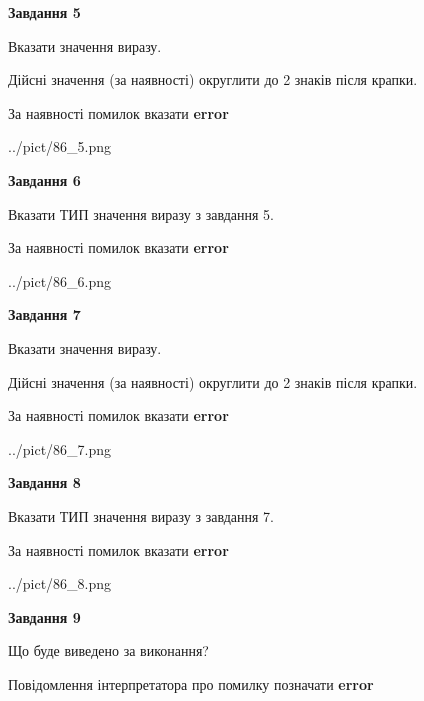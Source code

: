 \documentclass[11pt, ukrainian]{article}
\begin{document}
{\begin {large}
{\begin {center}\textbf{Завдання 5}\end {center}}\par
Вказати значення виразу. \par
Дійсні значення (за наявності) округлити до 2 знаків після крапки. \par
За наявності помилок вказати \textbf{error}

\begin{center}
	{../pict/86_5.png}
\end{center}
\newpage

{\begin {center}\textbf{Завдання 6}\end {center}}\par
Вказати ТИП значення виразу з завдання 5. \par
За наявності помилок вказати \textbf{error}

\begin{center}
	{../pict/86_6.png}
\end{center}
\newpage

{\begin {center}\textbf{Завдання 7}\end {center}}\par
Вказати значення виразу. \par
Дійсні значення (за наявності) округлити до 2 знаків після крапки. \par
За наявності помилок вказати \textbf{error}

\begin{center}
	{../pict/86_7.png}
\end{center}
\newpage

{\begin {center}\textbf{Завдання 8}\end {center}}\par
Вказати ТИП значення виразу з завдання 7. \par
За наявності помилок вказати \textbf{error}

\begin{center}
	{../pict/86_8.png}
\end{center}
\newpage

{\begin {center}\textbf{Завдання 9}\end {center}}\par
Що буде виведено за виконання? \par
Повідомлення інтерпретатора про помилку позначати \textbf{error}


\end{large}}
\end{document}
